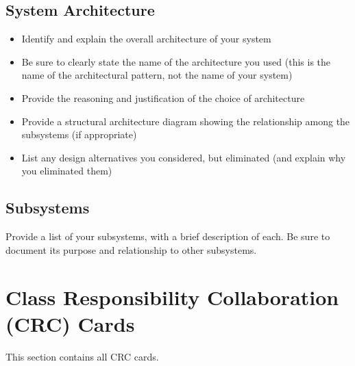 \documentclass[]{article}
\begin{document}
\subsection{System Architecture}
\label{sub:system_architecture}
\begin{itemize}
	\item Identify and explain the overall architecture of your system
	\item Be sure to clearly state the name of the architecture you used (this is the name of the architectural pattern, not the name of your system)
	\item Provide the reasoning and justification of the choice of architecture
	\item Provide a structural architecture diagram showing the relationship among the subsystems (if appropriate)
	\item List any design alternatives you considered, but eliminated (and explain why you eliminated them)
\end{itemize}

\subsection{Subsystems}
\label{sub:subsystems}
 Provide a list of your subsystems, with a brief description of each. Be sure to document its purpose and relationship to other subsystems.


	
\section{Class Responsibility Collaboration (CRC) Cards}
\label{sec:class_responsibility_collaboration_crc_cards}
This section contains all CRC cards.
\end{document}
